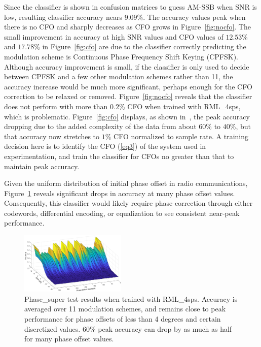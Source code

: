 Since the classifier is shown in confusion matrices to guess AM-SSB when SNR is low, resulting classifier accuracy nears $9.09\%$. The accuracy values peak when there is no CFO and sharply decreases as CFO grows in Figure~\ref{fig:nocfo}. The small improvement in accuracy at high SNR values and CFO values of $12.53\%$ and $17.78\%$ in Figure~\ref{fig:cfo} are due to the classifier correctly predicting the modulation scheme is Continuous Phase Frequency Shift Keying (CPFSK). Although accuracy improvement is small, if the classifier is only used to decide between CPFSK and a few other modulation schemes rather than 11, the accuracy increase would be much more significant, perhaps enough for the CFO correction to be relaxed or removed. Figure~\ref{fig:nocfo} reveals that the classifier does not perform with more than $0.2\%$ CFO when trained with RML\_4sps, which is problematic. Figure~\ref{fig:cfo} displays, as shown in~\cite{8170853}, the peak accuracy dropping due to the added complexity of the data from about $60\%$ to $40\%$, but that accuracy now stretches to $1\%$ CFO normalized to sample rate. A training decision here is to identify the CFO  (\ref{eq3}) of the system used in experimentation, and train the classifier for CFOs no greater than that to maintain peak accuracy.

Given the uniform distribution of initial phase offset in radio communications, Figure~\ref{fig:phase} reveals significant drops in accuracy at many phase offset values. Consequently, this classifier would likely require phase correction through either codewords, differential encoding, or equalization to see consistent near-peak performance.

\begin{figure}[ht!]
	\centering	\includegraphics[width=0.45\textwidth,keepaspectratio]{figs/phase_sweep.eps}
    \caption{Phase\_super test results when trained with RML\_4sps. Accuracy is averaged over 11 modulation schemes, and remains close to peak performance for phase offsets of less than 4 degrees and certain discretized values. $60\%$ peak accuracy can drop by as much as half for many phase offset values.} 
\label{fig:phase}      
\end{figure}


